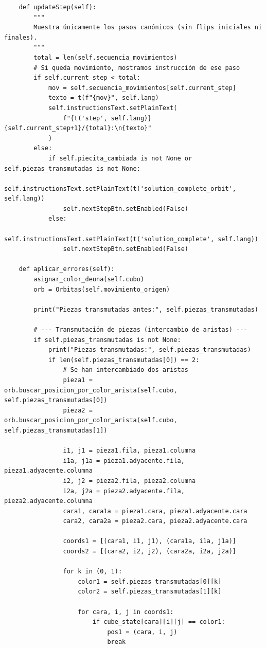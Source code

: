 \begin{lstlisting}
    def updateStep(self):
        """
        Muestra únicamente los pasos canónicos (sin flips iniciales ni finales).
        """
        total = len(self.secuencia_movimientos)
        # Si queda movimiento, mostramos instrucción de ese paso
        if self.current_step < total:
            mov = self.secuencia_movimientos[self.current_step]
            texto = t(f"{mov}", self.lang)
            self.instructionsText.setPlainText(
                f"{t('step', self.lang)} {self.current_step+1}/{total}:\n{texto}"
            )
        else:
            if self.piecita_cambiada is not None or self.piezas_transmutadas is not None:
                self.instructionsText.setPlainText(t('solution_complete_orbit', self.lang))
                self.nextStepBtn.setEnabled(False)
            else:
                self.instructionsText.setPlainText(t('solution_complete', self.lang))
                self.nextStepBtn.setEnabled(False)

    def aplicar_errores(self):
        asignar_color_deuna(self.cubo)
        orb = Orbitas(self.movimiento_origen)
        
        print("Piezas transmutadas antes:", self.piezas_transmutadas)
            
        # --- Transmutación de piezas (intercambio de aristas) ---
        if self.piezas_transmutadas is not None:
            print("Piezas transmutadas:", self.piezas_transmutadas)
            if len(self.piezas_transmutadas[0]) == 2:
                # Se han intercambiado dos aristas
                pieza1 = orb.buscar_posicion_por_color_arista(self.cubo, self.piezas_transmutadas[0])
                pieza2 = orb.buscar_posicion_por_color_arista(self.cubo, self.piezas_transmutadas[1])

                i1, j1 = pieza1.fila, pieza1.columna
                i1a, j1a = pieza1.adyacente.fila, pieza1.adyacente.columna
                i2, j2 = pieza2.fila, pieza2.columna
                i2a, j2a = pieza2.adyacente.fila, pieza2.adyacente.columna
                cara1, cara1a = pieza1.cara, pieza1.adyacente.cara
                cara2, cara2a = pieza2.cara, pieza2.adyacente.cara

                coords1 = [(cara1, i1, j1), (cara1a, i1a, j1a)]
                coords2 = [(cara2, i2, j2), (cara2a, i2a, j2a)]

                for k in (0, 1):
                    color1 = self.piezas_transmutadas[0][k]
                    color2 = self.piezas_transmutadas[1][k]

                    for cara, i, j in coords1:
                        if cube_state[cara][i][j] == color1:
                            pos1 = (cara, i, j)
                            break


\end{lstlisting}

